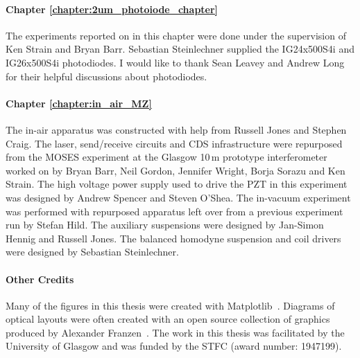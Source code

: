 \paragraph{Chapter \ref{chapter:2um_photoiode_chapter}}
The experiments reported on in this chapter were done under the supervision of Ken Strain and Bryan Barr. Sebastian Steinlechner supplied the IG24x500S4i and IG26x500S4i photodiodes. I would like to thank Sean Leavey and Andrew Long for their helpful discussions about photodiodes.
\paragraph{Chapter \ref{chapter:in_air_MZ}}
The in-air apparatus was constructed with help from Russell Jones and Stephen Craig. The laser, send/receive circuits and CDS infrastructure were repurposed from the MOSES experiment at the Glasgow 10\,m prototype interferometer worked on by Bryan Barr, Neil Gordon, Jennifer Wright, Borja Sorazu and Ken Strain. The high voltage power supply used to drive the PZT in this experiment was designed by Andrew Spencer and Steven O'Shea. The in-vacuum experiment was performed with repurposed apparatus left over from a previous experiment run by Stefan Hild. The auxiliary suspensions were designed by Jan-Simon Hennig and Russell Jones. The balanced homodyne suspension and coil drivers were designed by Sebastian Steinlechner.
\setlength{\parskip}{2em}
\paragraph{Other Credits}
Many of the figures in this thesis were created with Matplotlib~\cite{Caswell2021}. Diagrams of optical layouts were often created with an open source collection of graphics produced by Alexander Franzen~\cite{ComponentLibrary}. The work in this thesis was facilitated by the University of Glasgow and was funded by the STFC (award number: 1947199).